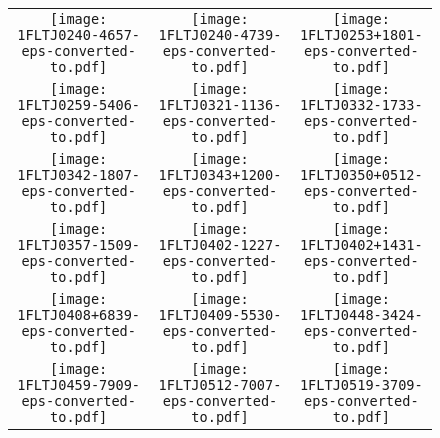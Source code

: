\begin{figure}[!t]%
      \centering      
      \ContinuedFloat%
\setlength\tabcolsep{0.0pt}
\begin{tabular}{ccc}  
  \texttt{[image: 1FLTJ0240-4657-eps-converted-to.pdf]}\label{fig:1FLTJ0240-4657}&
  \texttt{[image: 1FLTJ0240-4739-eps-converted-to.pdf]}\label{fig:1FLTJ0240-4739}&
  \texttt{[image: 1FLTJ0253+1801-eps-converted-to.pdf]}\label{fig:1FLTJ0253+1801}\\
  \texttt{[image: 1FLTJ0259-5406-eps-converted-to.pdf]}\label{fig:1FLTJ0259-5406}&
  \texttt{[image: 1FLTJ0321-1136-eps-converted-to.pdf]}\label{fig:1FLTJ0321-1136}&
  \texttt{[image: 1FLTJ0332-1733-eps-converted-to.pdf]}\label{fig:1FLTJ0332-1733}\\
  \texttt{[image: 1FLTJ0342-1807-eps-converted-to.pdf]}\label{fig:1FLTJ0342-1807}&
  \texttt{[image: 1FLTJ0343+1200-eps-converted-to.pdf]}\label{fig:1FLTJ0343+1200}&
  \texttt{[image: 1FLTJ0350+0512-eps-converted-to.pdf]}\label{fig:1FLTJ0350+0512}\\
  \texttt{[image: 1FLTJ0357-1509-eps-converted-to.pdf]}\label{fig:1FLTJ0357-1509}&
  \texttt{[image: 1FLTJ0402-1227-eps-converted-to.pdf]}\label{fig:1FLTJ0402-1227}&
  \texttt{[image: 1FLTJ0402+1431-eps-converted-to.pdf]}\label{fig:1FLTJ0402+1431}\\
  \texttt{[image: 1FLTJ0408+6839-eps-converted-to.pdf]}\label{fig:1FLTJ0408+6839}&
  \texttt{[image: 1FLTJ0409-5530-eps-converted-to.pdf]}\label{fig:1FLTJ0409-5530}&
  \texttt{[image: 1FLTJ0448-3424-eps-converted-to.pdf]}\label{fig:1FLTJ0448-3424}\\
  \texttt{[image: 1FLTJ0459-7909-eps-converted-to.pdf]}\label{fig:1FLTJ0459-7909}&
  \texttt{[image: 1FLTJ0512-7007-eps-converted-to.pdf]}\label{fig:1FLTJ0512-7007}&
  \texttt{[image: 1FLTJ0519-3709-eps-converted-to.pdf]}\label{fig:1FLTJ0519-3709}\\
\end{tabular}
\end{figure}
